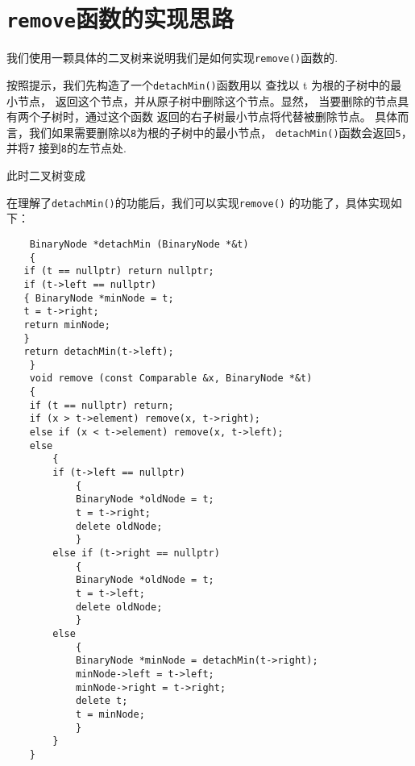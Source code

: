 \documentclass[UTF8]{ctexart}
\begin{document}
\pagestyle{fancy}
\fancyhead{}
\rhead{\today}

\section{\texttt{remove}函数的实现思路}
我们使用一颗具体的二叉树来说明我们是如何实现\texttt{remove()}函数的.
\par
\begin{center}

\end{center}
按照提示，我们先构造了一个\texttt{detachMin()}函数用以
查找以 t 为根的子树中的最小节点，
返回这个节点，并从原子树中删除这个节点。显然，
当要删除的节点具有两个子树时，通过这个函数
返回的右子树最小节点将代替被删除节点。
具体而言，我们如果需要删除以\texttt{8}为根的子树中的最小节点，
\texttt{detachMin()}函数会返回\texttt{5}，并将\texttt{7}
接到\texttt{8}的左节点处.\par
此时二叉树变成\par
\begin{center}

\end{center}
在理解了\texttt{detachMin()}的功能后，我们可以实现\texttt{remove()}
的功能了，具体实现如下：
\begin{lstlisting}
    BinaryNode *detachMin (BinaryNode *&t) 
    {
   if (t == nullptr) return nullptr;
   if (t->left == nullptr)
   { BinaryNode *minNode = t;
   t = t->right;
   return minNode;
   }
   return detachMin(t->left);
    }
    void remove (const Comparable &x, BinaryNode *&t) 
    {
    if (t == nullptr) return;
    if (x > t->element) remove(x, t->right);
    else if (x < t->element) remove(x, t->left);
    else
        {
        if (t->left == nullptr) 
            {
            BinaryNode *oldNode = t;
            t = t->right;
            delete oldNode;
            }
        else if (t->right == nullptr) 
            {
            BinaryNode *oldNode = t;
            t = t->left;
            delete oldNode;
            }
        else
            {
            BinaryNode *minNode = detachMin(t->right);
            minNode->left = t->left;
            minNode->right = t->right;
            delete t;
            t = minNode;
            }
        }
    }

\end{lstlisting}
\end{document}
